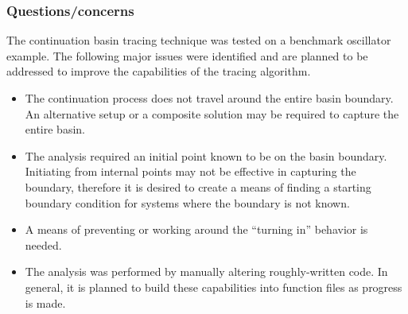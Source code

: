 \documentclass[12pt]{article}
\begin{document}
\subsubsection{Questions/concerns}
The continuation basin tracing technique was tested on a benchmark oscillator example. The following major issues were identified and are planned to be addressed to improve the capabilities of the tracing algorithm.

\begin{itemize}
\item The continuation process does not travel around the entire basin boundary. An alternative setup or a composite solution may be required to capture the entire basin.
\item The analysis required an initial point known to be on the basin boundary. Initiating from internal points may not be effective in capturing the boundary, therefore it is desired to create a means of finding a starting boundary condition for systems where the boundary is not known.
\item A means of preventing or working around the ``turning in'' behavior is needed.
\item The analysis was performed by manually altering roughly-written code. In general, it is planned to build these capabilities into function files as progress is made.
\end{itemize}




\end{document}
